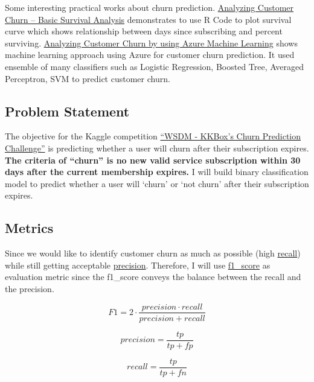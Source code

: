\documentclass[11pt]{article}
\begin{document}
Some interesting practical works about churn prediction.
\href{http://daynebatten.com/2015/02/customer-churn-survival-analysis/}{Analyzing
Customer Churn -- Basic Survival Analysis} demonstrates to use R Code to
plot survival curve which shows relationship between days since
subscribing and percent surviving.
\href{https://docs.microsoft.com/en-us/azure/machine-learning/studio/azure-ml-customer-churn-scenario}{Analyzing
Customer Churn by using Azure Machine Learning} shows machine learning
approach using Azure for customer churn prediction. It used ensemble of
many classifiers such as Logistic Regression, Boosted Tree, Averaged
Perceptron, SVM to predict customer churn.

\subsection{Problem Statement}\label{problem-statement}

The objective for the Kaggle competition
\href{https://www.kaggle.com/c/kkbox-churn-prediction-challenge}{``WSDM
- KKBox's Churn Prediction Challenge''} is predicting whether a user
will churn after their subscription expires. \textbf{The criteria of
``churn'' is no new valid service subscription within 30 days after the
current membership expires.} I will build binary classification model to
predict whether a user will `churn' or `not churn' after their
subscription expires.

\subsection{Metrics}\label{metrics}

Since we would like to identify customer churn as much as possible (high
\href{https://machinelearningmastery.com/classification-accuracy-is-not-enough-more-performance-measures-you-can-use/}{recall})
while still getting acceptable
\href{https://machinelearningmastery.com/classification-accuracy-is-not-enough-more-performance-measures-you-can-use/}{precision}.
Therefore, I will use
\href{https://machinelearningmastery.com/classification-accuracy-is-not-enough-more-performance-measures-you-can-use/}{f1\_score}
as evaluation metric since the f1\_score conveys the balance between the
recall and the precision.

\[ F1 = 2 \cdot \frac{precision \cdot recall}{precision + recall} \]

\[ precision = \frac{tp}{tp + fp} \]

\[ recall = \frac{tp}{tp + fn} \]
\end{document}
